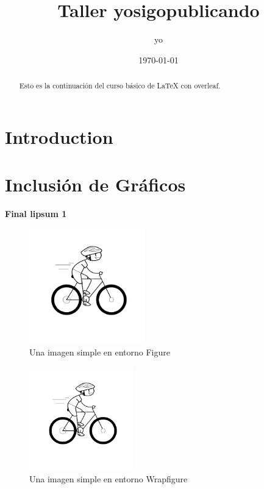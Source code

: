 \documentclass{article}
\title{Taller yosigopublicando}
\author{yo}
\date{\today}
\begin{document}
\maketitle

\section{Introduction}

\begin{abstract}
Esto es la continuación del curso básico de \LaTeX{} con overleaf.
\end{abstract}
\section{Inclusión de Gráficos}
\lipsum %

{\bf Final lipsum 1}

\begin{figure}[h]
    \centering
    \includegraphics[height=5cm,angle=25]{graficos/ciclista.png}
    \caption{Una imagen simple en entorno Figure}
    \label{fig:1}
\end{figure}

\begin{figure}
 \vspace{-0.5cm}
 \includegraphics[trim= 0mm 15mm 0mm 8mm,clip,width=0.4\textwidth]{graficos/ciclista.png}
    \caption{Una imagen simple en entorno Wrapfigure}
\end{figure}
\end{document}

